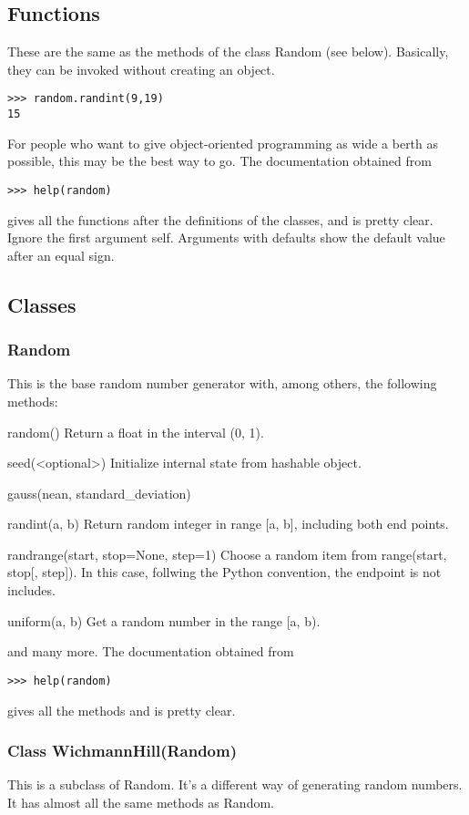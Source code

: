 \documentclass{article}
\begin{document}
\subsection{Functions}

These are the same as the methods of the class {\ttfamily Random} (see below).
Basically,
they can be invoked without creating an object.
\begin{verbatim}
>>> random.randint(9,19)
15
\end{verbatim}
For people who want to give object-oriented programming as wide a berth as
possible, this may be the best way to go.
The documentation obtained from
\begin{verbatim}
>>> help(random)
\end{verbatim}
gives all the functions after the definitions of the classes, and is pretty clear.
Ignore the first
argument {\ttfamily self}.  Arguments with defaults show the default value
after an equal sign.

\subsection{Classes}

\subsubsection{{\ttfamily Random}}

This is the base random number generator with, among others,
 the following methods:
\begin{description}
\item{{\ttfamily random()}}
      Return a float in the interval (0, 1).
\item{{\ttfamily seed(<optional>)}} Initialize internal state from hashable object.
\item{{\ttfamily gauss(nean, standard\_deviation)}}
\item{{\ttfamily randint(a, b)}}
      Return random integer in range [a, b], including both end points.
\item{{\ttfamily randrange(start, stop=None, step=1)}}
      Choose a random item from range(start, stop[, step]). In this case,
      follwing the Python convention, the endpoint is not includes.
\item{{\ttfamily uniform(a, b)}}
      Get a random number in the range [a, b).
\end{description}
and many more. The documentation obtained from
\begin{verbatim}
>>> help(random)
\end{verbatim}
gives all the methods and is pretty clear.

\subsubsection{Class {\ttfamily WichmannHill(Random)}}

This is a subclass of {\ttfamily Random}.
It's a different way of generating random numbers.  It has almost all the same
methods as {\ttfamily Random}.
\end{document}
